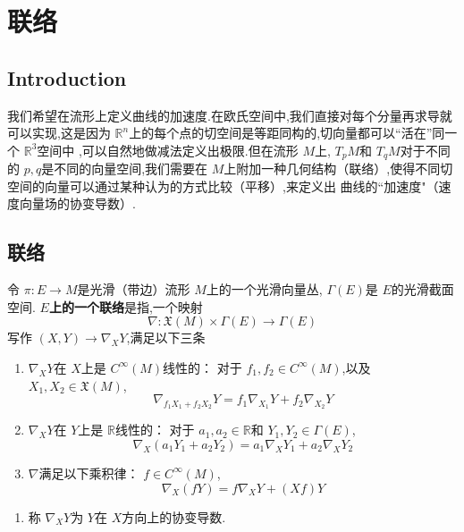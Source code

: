\documentclass[../../几何与拓扑.tex]{subfiles}
\begin{document}
    
\ifSubfilesClassLoaded{
    \frontmatter

    \tableofcontents
    
    \mainmatter
}{}

\chapter{联络}

\section{Introduction}

我们希望在流形上定义曲线的加速度.在欧氏空间中,我们直接对每个分量再求导就可以实现,这是因为 \(  \mathbb{R} ^{n}  \)上的每个点的切空间是等距同构的,切向量都可以“活在”同一个 \(  \mathbb{R} ^{3}  \)空间中  
,可以自然地做减法定义出极限.但在流形 \(  M  \)上, \(  T_{p}M  \)和 \(  T_{q}M  \)对于不同的 \(  p,q  \)是不同的向量空间,我们需要在 \(  M  \)上附加一种几何结构（联络）,使得不同切空间的向量可以通过某种认为的方式比较（平移）,来定义出 曲线的“加速度"（速度向量场的协变导数）.   
\section{联络}
\begin{definition}
    令 \(  \pi : E\to M  \)是光滑（带边）流形 \(  M  \)上的一个光滑向量丛, \(   \Gamma \left( E \right)   \)是 \(  E  \)的光滑截面空间.
     \textbf{\(  E  \)上的一个联络}是指,一个映射 \[
     \nabla : \mathfrak{X}\left( M \right) \times   \Gamma \left( E \right)\to  \Gamma \left( E \right)   
     \]写作 \(  \left( X,Y \right)\to \nabla _{X}Y   \),满足以下三条 
     \begin{enumerate}
        \item \(  \nabla _{X}Y  \)在 \(  X  \)上是 \(  C^{\infty}\left( M \right)   \)线性的： 对于 \(  f_1,f_2\in C^{\infty}\left( M \right)   \),以及 \(  X_1,X_2 \in \mathfrak{X}\left( M \right)   \), \[
        \nabla _{f_1X_1+ f_2X_2}Y = f_1 \nabla _{X_1}Y+ f_2\nabla _{X_2}Y
        \]
        \item \(  \nabla _{X}Y  \)在 \(  Y  \)上是 \(  \mathbb{R}   \)线性的： 对于 \(  a_1,a_2 \in \mathbb{R}   \)和 \(  Y_1,Y_2 \in  \Gamma \left( E \right)   \), \[
        \nabla _{X}\left( a_1Y_1+ a_2Y_2 \right)=  a_1\nabla _{X}Y_1+ a_2\nabla _{X}Y_2 
        \]
        \item \(  \nabla   \)满足以下乘积律：  \(  f \in C^{\infty}\left( M \right)   \), \[
        \nabla _{X}\left( fY \right)= f\nabla _{X}Y+  \left( Xf \right)Y  
        \]            
     \end{enumerate}
           
\end{definition}
\begin{remark}
    \begin{enumerate}
        \item 称 \(  \nabla _{X}Y  \)为 \(  Y  \)在 \(  X  \)方向上的协变导数.   
    \end{enumerate}
    
\end{remark}
\end{document}
